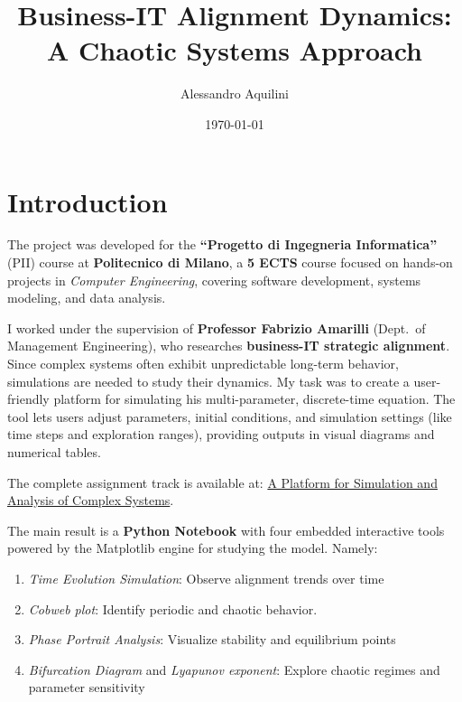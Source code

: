 \documentclass[a4paper, 10pt]{article}
\title{Business-IT Alignment Dynamics: A Chaotic Systems Approach}
\author{Alessandro Aquilini}
\date{\today}
\begin{document}
\raggedright 

\maketitle

\tableofcontents

\clearpage

\section{Introduction}
The project was developed for the \textbf{``Progetto di Ingegneria Informatica''} (PII) course at \textbf{Politecnico di Milano}, a \textbf{5 ECTS} course focused on hands-on projects in \textit{Computer Engineering}, covering software development, systems modeling, and data analysis.

I worked under the supervision of \textbf{Professor Fabrizio Amarilli} (Dept.\ of Management Engineering), who researches \textbf{business-IT strategic alignment}. Since complex systems often exhibit unpredictable long-term behavior, simulations are needed to study their dynamics. \newline
My task was to create a user-friendly platform for simulating his multi-parameter, discrete-time equation. The tool lets users adjust parameters, initial conditions, and simulation settings (like time steps and exploration ranges), providing outputs in visual diagrams and numerical tables.

The complete assignment track is available at: 
\href{https://pii.deib.polimi.it/a-platform-for-simulation-and-analysis-of-complex-systems/}{A Platform for Simulation and Analysis of Complex Systems}.

The main result is a \textbf{Python Notebook} with four embedded interactive tools powered by the Matplotlib engine for studying the model. Namely:

\begin{enumerate}
    \item \textit{Time Evolution Simulation}: Observe alignment trends over time
    \item \textit{Cobweb plot}: Identify periodic and chaotic behavior.
    \item \textit{Phase Portrait Analysis}: Visualize stability and equilibrium points
    \item \textit{Bifurcation Diagram} and \textit{Lyapunov exponent}: Explore chaotic regimes and parameter sensitivity
\end{enumerate}
\end{document}
